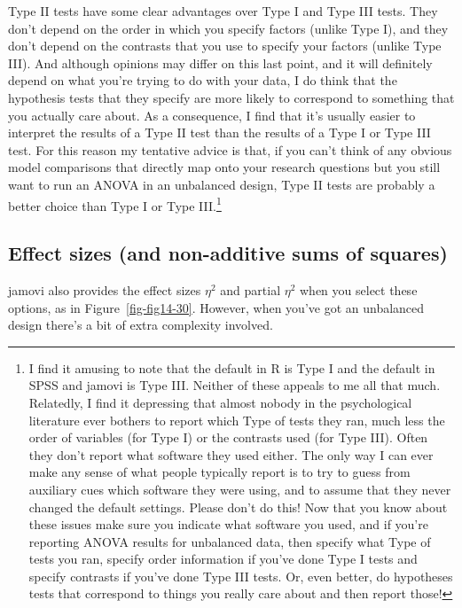 \documentclass[
  a4paper,
]{book}
\begin{document}
Type II tests have some clear advantages over Type I and Type III tests.
They don't depend on the order in which you specify factors (unlike Type
I), and they don't depend on the contrasts that you use to specify your
factors (unlike Type III). And although opinions may differ on this last
point, and it will definitely depend on what you're trying to do with
your data, I do think that the hypothesis tests that they specify are
more likely to correspond to something that you actually care about. As
a consequence, I find that it's usually easier to interpret the results
of a Type II test than the results of a Type I or Type III test. For
this reason my tentative advice is that, if you can't think of any
obvious model comparisons that directly map onto your research questions
but you still want to run an ANOVA in an unbalanced design, Type II
tests are probably a better choice than Type I or Type III.\footnote{I
  find it amusing to note that the default in R is Type I and the
  default in SPSS and jamovi is Type III. Neither of these appeals to me
  all that much. Relatedly, I find it depressing that almost nobody in
  the psychological literature ever bothers to report which Type of
  tests they ran, much less the order of variables (for Type I) or the
  contrasts used (for Type III). Often they don't report what software
  they used either. The only way I can ever make any sense of what
  people typically report is to try to guess from auxiliary cues which
  software they were using, and to assume that they never changed the
  default settings. Please don't do this! Now that you know about these
  issues make sure you indicate what software you used, and if you're
  reporting ANOVA results for unbalanced data, then specify what Type of
  tests you ran, specify order information if you've done Type I tests
  and specify contrasts if you've done Type III tests. Or, even better,
  do hypotheses tests that correspond to things you really care about
  and then report those!}

\hypertarget{effect-sizes-and-non-additive-sums-of-squares}{%
\subsection{Effect sizes (and non-additive sums of
squares)}\label{effect-sizes-and-non-additive-sums-of-squares}}

jamovi also provides the effect sizes \(\eta^2\) and partial \(\eta^2\)
when you select these options, as in Figure~\ref{fig-fig14-30}. However,
when you've got an unbalanced design there's a bit of extra complexity
involved.
\end{document}
